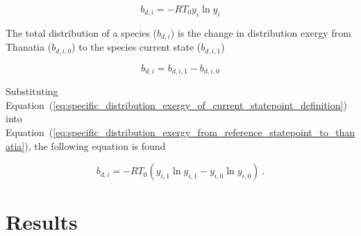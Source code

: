 \documentclass[energies,article,submit,pdftex,moreauthors]{Definitions/mdpi}
\begin{document}
\begin{equation}\label{eq:specific_distribution_exergy_of_current_statepoint_definition}
  b_{d,i} = -RT_{0}y_{i}\ln{y_{i}}
\end{equation}

The total distribution of a species ($b_{d,i}$) is the change in distribution exergy from Thanatia ($b_{d,i,0}$)
to the species current state ($b_{d,i,1}$)

\begin{equation}\label{eq:specific_distribution_exergy_from_reference_statepoint_to_thanatia}
  b_{d,i} = b_{d,i,1} - b_{d,i,0}
\end{equation}

Substituting Equation~(\ref{eq:specific_distribution_exergy_of_current_statepoint_definition}) into Equation~(\ref{eq:specific_distribution_exergy_from_reference_statepoint_to_thanatia}),
the following equation is found

\begin{equation} \label{eq:specific_distribution_exergy_from_statepoint_to_thanatia_definition}
  b_{d,i} = -RT_{0}(y_{i,1}\ln{y_{i,1}} - y_{i,0}\ln{y_{i,0}}) \ .
\end{equation}




\section{Results}
\end{document}
